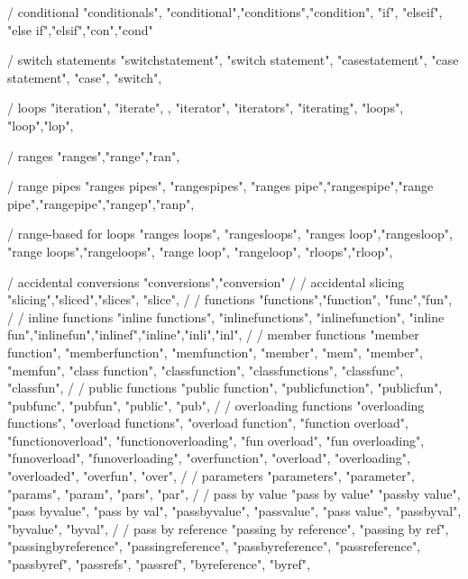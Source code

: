         / conditional
        "conditionals", "conditional","conditions","condition", "if", "elseif", "else if","elsif","con","cond"

        / switch statements
        "switchstatement", "switch statement", 
        "casestatement", "case statement", 
        "case", "switch", 

        / loops
        "iteration", "iterate", ,
        "iterator", "iterators", 
        "iterating", "loops", "loop","lop",

        / ranges
        "ranges","range","ran",
        
        / range pipes
        "ranges pipes", "rangespipes",
        "ranges pipe","rangespipe","range pipe","rangepipe","rangep","ranp", 

        / range-based for loops
        "ranges loops", "rangesloops",  
        "ranges loop","rangesloop",  
        "range loops","rangeloops",  
        "range loop", "rangeloop",  
        "rloops","rloop",  

        / accidental conversions
        "conversions","conversion"
        /
        / accidental slicing 
        "slicing","sliced","slices", "slice",
        /
        / functions
        "functions","function", "func","fun",
        /
        / inline functions
        "inline functions",  
        "inlinefunctions", "inlinefunction", "inline fun","inlinefun","inlinef","inline","inli","inl", 
        /
        / member functions
        "member function",  
        "memberfunction",  
        "memfunction",  
        "member",  
        "mem",  
        "member",  
        "memfun",  
        "class function",  
        "classfunction", 
        "classfunctions", 
        "classfunc",  
        "classfun",  
        /
        / public functions
        "public function", 
        "publicfunction", 
        "publicfun", 
        "pubfunc", 
        "pubfun", 
        "public",  
        "pub",  
        /
        / overloading functions
        "overloading functions", 
        "overload functions", 
        "overload function", 
        "function overload", 
        "functionoverload", 
        "functionoverloading", 
        "fun overload", 
        "fun overloading", 
        "funoverload", 
        "funoverloading", 
        "overfunction",  
        "overload",  
        "overloading", 
        "overloaded",  
        "overfun",  
        "over",  
        /
        / parameters
        "parameters",  
        "parameter",  
        "params",  
        "param",  
        "pars",  
        "par",  
        /
        / pass by value
        "pass by value"
        "passby value",
        "pass byvalue",
        "pass by val",
        "passbyvalue",
        "passvalue",
        "pass value",
        "passbyval",
        "byvalue",
        "byval",
        /
        / pass by reference
        "passing by reference",  
        "passing by ref",  
        "passingbyreference",  
        "passingreference",  
        "passbyreference",  
        "passreference",  
        "passbyref",  
        "passrefs",  
        "passref",  
        "byreference", 
        "byref", 

